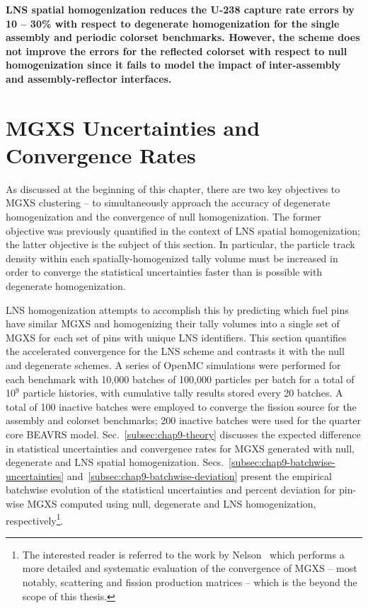 \begin{emphbox}
\textbf{\ac{LNS} spatial homogenization reduces the U-238 capture rate errors by 10 -- 30\% with respect to degenerate homogenization for the single assembly and periodic colorset benchmarks. However, the scheme does not improve the errors for the reflected colorset with respect to null homogenization since it fails to model the impact of inter-assembly and assembly-reflector interfaces.}
\end{emphbox}


\section{MGXS Uncertainties and Convergence Rates}
\label{sec:chap9-convergence}

As discussed at the beginning of this chapter, there are two key objectives to \ac{MGXS} clustering -- to simultaneously approach the accuracy of degenerate homogenization and the convergence of null homogenization. The former objective was previously quantified in the context of \ac{LNS} spatial homogenization; the latter objective is the subject of this section. In particular, the particle track density within each spatially-homogenized tally volume must be increased in order to converge the statistical uncertainties faster than is possible with degenerate homogenization.

\ac{LNS} homogenization attempts to accomplish this by predicting which fuel pins have similar \ac{MGXS} and homogenizing their tally volumes into a single set of \ac{MGXS} for each set of pins with unique \ac{LNS} identifiers. This section quantifies the accelerated convergence for the \ac{LNS} scheme and contrasts it with the null and degenerate schemes. A series of OpenMC simulations were performed for each benchmark with 10,000 batches of 100,000 particles per batch for a total of 10$^{9}$ particle histories, with cumulative tally results stored every 20 batches. A total of 100 inactive batches were employed to converge the fission source for the assembly and colorset benchmarks; 200 inactive batches were used for the quarter core \ac{BEAVRS} model. Sec.~\ref{subsec:chap9-theory} discusses the expected difference in statistical uncertainties and convergence rates for \ac{MGXS} generated with null, degenerate and \ac{LNS} spatial homogenization. Secs.~\ref{subsec:chap9-batchwise-uncertainties} and~\ref{subsec:chap9-batchwise-deviation} present the empirical batchwise evolution of the statistical uncertainties and percent deviation for pin-wise \ac{MGXS} computed using null, degenerate and \ac{LNS} homogenization, respectively\footnote{The interested reader is referred to the work by Nelson~\cite{nelson2014improved} which performs a more detailed and systematic evaluation of the convergence of \ac{MGXS} -- most notably, scattering and fission production matrices -- which is the beyond the scope of this thesis.}.

